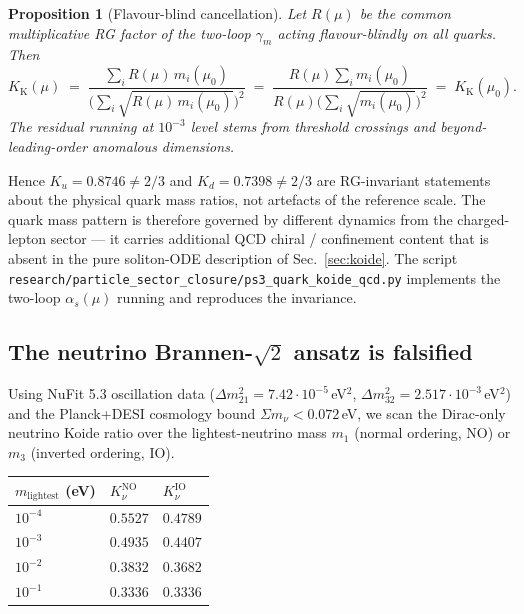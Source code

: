 \documentclass[11pt,a4paper]{article}
\newcommand{\Kkoide}{K_{\mathrm{K}}}
\newtheorem{proposition}[theorem]{Proposition}
\begin{document}
\begin{proposition}[Flavour-blind cancellation]\label{prop:qcd-invariance}
Let $R(\mu)$ be the common multiplicative RG factor of the two-loop
$\gamma_{m}$ acting flavour-blindly on all quarks. Then
\begin{equation}\label{eq:R-cancel}
  \Kkoide(\mu)
  \;=\; \frac{\sum_{i} R(\mu)\,m_{i}(\mu_{0})}
              {\bigl(\sum_{i}\sqrt{R(\mu)\,m_{i}(\mu_{0})}\bigr)^{2}}
  \;=\; \frac{R(\mu)\sum_{i} m_{i}(\mu_{0})}
              {R(\mu)\bigl(\sum_{i}\sqrt{m_{i}(\mu_{0})}\bigr)^{2}}
  \;=\; \Kkoide(\mu_{0}).
\end{equation}
The residual running at $10^{-3}$ level stems from threshold crossings
and beyond-leading-order anomalous dimensions.
\end{proposition}

\noindent
Hence $K_{u}=0.8746\neq 2/3$ and $K_{d}=0.7398\neq 2/3$ are
RG-invariant statements about the physical quark mass ratios, not
artefacts of the reference scale. The quark mass pattern is therefore
governed by different dynamics from the charged-lepton sector --- it
carries additional QCD chiral / confinement content that is absent in
the pure soliton-ODE description of Sec.~\ref{sec:koide}. The script
\verb|research/particle_sector_closure/ps3_quark_koide_qcd.py|
implements the two-loop $\alpha_{s}(\mu)$ running and reproduces the
invariance.

\subsection{The neutrino Brannen-\texorpdfstring{$\sqrt{2}$}{sqrt2} ansatz is falsified}

Using NuFit 5.3 oscillation data ($\Delta m^{2}_{21}=7.42\cdot
10^{-5}$\,eV$^{2}$, $\Delta m^{2}_{32}=2.517\cdot 10^{-3}$\,eV$^{2}$)
and the Planck+DESI cosmology bound $\Sigma m_{\nu}<0.072$\,eV, we
scan the Dirac-only neutrino Koide ratio over the lightest-neutrino
mass $m_{1}$ (normal ordering, NO) or $m_{3}$ (inverted ordering, IO).

\begin{center}\small
{}
\label{tab:nu-koide}
\begin{tabular}{@{}lll@{}}
\toprule
$m_{\mathrm{lightest}}$ (eV) & $K_{\nu}^{\mathrm{NO}}$ & $K_{\nu}^{\mathrm{IO}}$\\
\midrule
$10^{-4}$ & $\mathbf{0.5527}$ & $0.4789$\\
$10^{-3}$ & $0.4935$          & $0.4407$\\
$10^{-2}$ & $0.3832$          & $0.3682$\\
$10^{-1}$ & $0.3336$          & $0.3336$\\
\bottomrule
\end{tabular}
\end{center}
\end{document}
